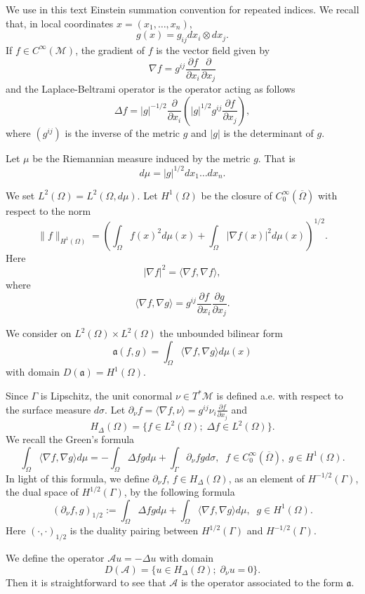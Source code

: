 \documentclass[10pt]{amsart}
\theoremstyle{definition}
\begin{document}
We use  in this text Einstein summation convention for repeated indices. We recall that, in local coordinates $x=(x_1,\ldots ,x_n)$,
\[
g(x)=g_{ij}dx_i\otimes dx_j.
\]
If $f\in C^\infty (\mathcal{M})$,  the gradient of $f$ is the vector field given by
\[
\nabla f= g^{ij}\frac{\partial f}{\partial x_i}\frac{\partial}{\partial x_j}
\]
and the Laplace-Beltrami operator is the operator acting as follows
\[
\Delta f=|g|^{-1/2}\frac{\partial}{\partial x_i}\left( |g|^{1/2}g^{ij}\frac{\partial f}{\partial x_j}\right),
\]
where $(g^{ij})$ is the inverse of the metric $g$ and $|g|$ is the determinant of $g$.

\smallskip
Let $\mu$ be the Riemannian measure induced by the metric $g$. That is
\[
d\mu = |g|^{1/2}dx_1\ldots dx_n.
\]

We set $L^2(\Omega )=L^2(\Omega , d\mu)$. Let $H^1(\Omega )$ be the closure of $C_0^\infty (\overline{\Omega})$ with respect to the norm
\[
\|f\|_{H^1(\Omega )}=\left(\int_\Omega f(x)^2d\mu (x)+\int_\Omega |\nabla f(x)|^2d\mu (x)\right)^{1/2}.
\]
Here
\[
|\nabla f|^2=\langle \nabla f,\nabla f\rangle,
\]
where
\[
\langle \nabla f,\nabla g\rangle = g^{ij}\frac{\partial f}{\partial x_i}\frac{\partial g}{\partial x_j}.
\]

We consider on $L^2(\Omega )\times L^2(\Omega )$ the unbounded bilinear form 
\[
\mathfrak{a}(f,g)=\int_\Omega \langle \nabla f,\nabla g\rangle d\mu(x)
\]
with domain $D(\mathfrak{a})=H^1(\Omega )$.
 
\smallskip
Since $\Gamma$ is Lipschitz, the unit conormal $\nu \in T^\ast \mathcal{M}$ is defined a.e. with respect to the surface measure $d\sigma$. Let $\partial _\nu f=\langle \nabla f,\nu \rangle =g^{ij}\nu _i\frac{\partial f}{\partial x_j}$ and
\[
H_\Delta (\Omega )=\{f\in L^2(\Omega );\; \Delta f\in L^2(\Omega )\}.
\]
We recall the Green's formula
\[
\int_\Omega \langle \nabla f, \nabla g\rangle d\mu =-\int_\Omega \Delta fgd\mu +\int_\Gamma \partial _\nu fg d\sigma ,\;\; f\in C_0^\infty (\overline{\Omega}),\; g\in H^1(\Omega ).
\]
In light of this formula, we  define $\partial _\nu f$, $f\in H_\Delta (\Omega )$, as an element of $H^{-1/2}(\Gamma )$, the dual space of $H^{1/2}(\Gamma )$, by the following formula
\[
(\partial _\nu f,g)_{1/2}:=\int_\Omega \Delta fgd\mu + \int_\Omega \langle \nabla f, \nabla g\rangle d\mu ,\;\;  g\in H^1(\Omega ).
\]
Here $(\cdot ,\cdot )_{1/2}$ is the duality pairing between $H^{1/2}(\Gamma )$ and $H^{-1/2}(\Gamma )$.

\smallskip
We define the operator $\mathcal{A}u=-\Delta u$ with domain 
\[
D(\mathcal{A})=\{ u\in H_\Delta (\Omega );\; \partial _\nu u=0\}.
\]
Then it is straightforward to see that $\mathcal{A}$ is the operator associated to the form $\mathfrak{a}$.
\end{document}
